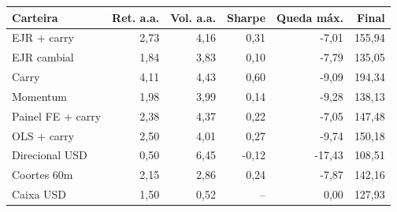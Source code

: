\begin{tabular}{lrrrrr}
\toprule
Carteira & Ret. a.a. & Vol. a.a. & Sharpe & Queda máx. & Final \\
\midrule
EJR + carry & 2,73 & 4,16 & 0,31 & -7,01 & 155,94 \\
EJR cambial & 1,84 & 3,83 & 0,10 & -7,79 & 135,05 \\
Carry & 4,11 & 4,43 & 0,60 & -9,09 & 194,34 \\
Momentum & 1,98 & 3,99 & 0,14 & -9,28 & 138,13 \\
Painel FE + carry & 2,38 & 4,37 & 0,22 & -7,05 & 147,48 \\
OLS + carry & 2,50 & 4,01 & 0,27 & -9,74 & 150,18 \\
Direcional USD & 0,50 & 6,45 & -0,12 & -17,43 & 108,51 \\
Coortes 60m & 2,15 & 2,86 & 0,24 & -7,87 & 142,16 \\
Caixa USD & 1,50 & 0,52 & -- & 0,00 & 127,93 \\
\bottomrule
\end{tabular}